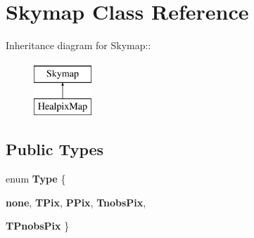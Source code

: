 \hypertarget{classSkymap}{
\section{Skymap Class Reference}
\label{classSkymap}
}
Inheritance diagram for Skymap::\begin{figure}[H]
\begin{center}
\leavevmode
\includegraphics[height=2cm]{classSkymap}
\end{center}
\end{figure}
\subsection*{Public Types}
\begin{DoxyCompactItemize}
\item 
enum {\bfseries Type} \{ \par
{\bfseries none}, 
{\bfseries TPix}, 
{\bfseries PPix}, 
{\bfseries TnobsPix}, 
\par
{\bfseries TPnobsPix}
 \}
\end{DoxyCompactItemize}
